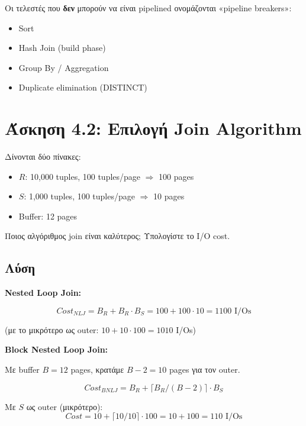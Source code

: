 \begin{infobox}
Οι τελεστές που \textbf{δεν} μπορούν να είναι pipelined ονομάζονται «pipeline breakers»:
\begin{itemize}
    \item Sort
    \item Hash Join (build phase)
    \item Group By / Aggregation
    \item Duplicate elimination (DISTINCT)
\end{itemize}
\end{infobox}

\section{Άσκηση 4.2: Επιλογή Join Algorithm}

\begin{formulabox}[Εκφώνηση]
Δίνονται δύο πίνακες:
\begin{itemize}
    \item $R$: 10,000 tuples, 100 tuples/page $\Rightarrow$ 100 pages
    \item $S$: 1,000 tuples, 100 tuples/page $\Rightarrow$ 10 pages
    \item Buffer: 12 pages
\end{itemize}

Ποιος αλγόριθμος join είναι καλύτερος; Υπολογίστε το I/O cost.
\end{formulabox}

\subsection*{Λύση}

\textbf{Nested Loop Join:}

$$Cost_{NLJ} = B_R + B_R \cdot B_S = 100 + 100 \cdot 10 = 1100 \text{ I/Os}$$

(με το μικρότερο ως outer: $10 + 10 \cdot 100 = 1010$ I/Os)

\textbf{Block Nested Loop Join:}

Με buffer $B = 12$ pages, κρατάμε $B-2 = 10$ pages για τον outer.

$$Cost_{BNLJ} = B_R + \lceil B_R / (B-2) \rceil \cdot B_S$$

Με $S$ ως outer (μικρότερο):
$$Cost = 10 + \lceil 10/10 \rceil \cdot 100 = 10 + 100 = 110 \text{ I/Os}$$

